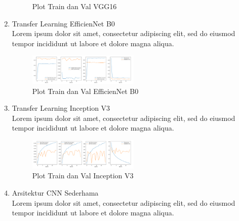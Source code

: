 \begin{enumerate}[nolistsep]
\begin{figure} [ht]
    \caption{Plot Train dan Val VGG16}
    \label{fig:PlotVGG16}
  \end{figure}

  \item Transfer Learning EfficienNet B0 \\
  Lorem ipsum dolor sit amet, consectetur adipiscing elit, sed do eiusmod tempor incididunt ut labore et dolore magna 
  aliqua. \\

  \begin{figure} [ht]
    \centering
    \includegraphics[width=0.5\textwidth]{gambar/PlotEfficienNet.png}

    \caption{Plot Train dan Val EfficienNet B0}
    \label{fig:PlotEfficienNetB0}
  \end{figure}

  \item Transfer Learning Inception V3 \\
  Lorem ipsum dolor sit amet, consectetur adipiscing elit, sed do eiusmod tempor incididunt ut labore et dolore magna 
  aliqua. \\

  \begin{figure} [ht]
    \centering
    \includegraphics[width=0.5\textwidth]{gambar/PlotInceptionV3.png}

    \caption{Plot Train dan Val Inception V3}
    \label{fig:PlotInceptionV3}
  \end{figure}

  \item Arsitektur CNN Sederhama \\
  Lorem ipsum dolor sit amet, consectetur adipiscing elit, sed do eiusmod tempor incididunt ut labore et dolore magna 
  aliqua. \\


\end{enumerate}
